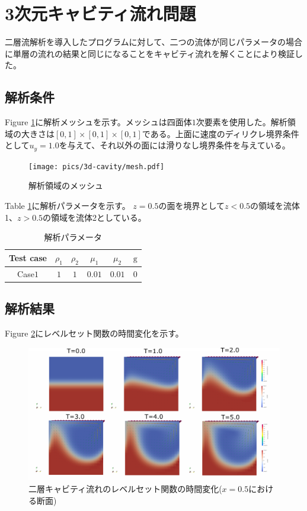 \newpage
\section{3次元キャビティ流れ問題}
二層流解析を導入したプログラムに対して、二つの流体が同じパラメータの場合に単層の流れの結果と同じになることをキャビティ流れを解くことにより検証した。

\subsection{解析条件}
Figure \ref{fig:3d-cavity-mesh}に解析メッシュを示す。メッシュは四面体$1$次要素を使用した。解析領域の大きさは$[0, 1]\times[0,1]\times[0,1]$である。上面に速度のディリクレ境界条件として$u_{y}=1.0$を与えて、それ以外の面には滑りなし境界条件を与えている。
\begin{figure}[H]
	\centering
	\texttt{[image: pics/3d-cavity/mesh.pdf]}
	\caption{解析領域のメッシュ}
	\label{fig:3d-cavity-mesh}
\end{figure}

Table \ref{table:fluid-ml-cavity-parameter}に解析パラメータを示す。
$z=0.5$の面を境界として$z<0.5$の領域を流体1、$z>0.5$の領域を流体2としている。
\renewcommand{\arraystretch}{1}
\begin{table}[H]
	\centering
	\caption{解析パラメータ}
	\begin{tabular}{cccccc}
		\hline
		Test case & $\rho_1$ & $\rho_2$ & $\mu_1$ & $\mu_2$ & $\mathrm{g}$\\
		\hline 
		Case$1$ & $1$ & $1$ & $0.01$ & $0.01$   & $0$ \\
		\hline         
	\end{tabular}
	\label{table:fluid-ml-cavity-parameter}
\end{table}
\renewcommand{\arraystretch}{1.0}

\subsection{解析結果}

Figure \ref{fig:3d-cavity-result-levelset}にレベルセット関数の時間変化を示す。
\begin{figure}[H]
	\centering
	\includegraphics[width=18truecm]{pics/3d-cavity/levelset_velocity.pdf}
	\caption{二層キャビティ流れのレベルセット関数の時間変化($x=0.5$における断面)}
	\label{fig:3d-cavity-result-levelset}
\end{figure}

